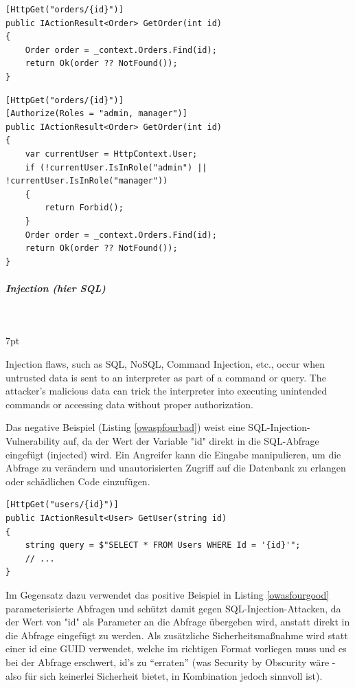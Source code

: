 \documentclass[notitlepage, hidelinks]{article}
\newenvironment{formal}{%
  \def\FrameCommand{%
    \hspace{1pt}%
    {\color{black}\vrule width 2pt}%
    {\color{formalshade}\vrule width 4pt}%
    \colorbox{formalshade}%
  }%
  \MakeFramed{\advance\hsize-\width\FrameRestore}%
  \noindent\hspace{-4.55pt}%
  \begin{adjustwidth}{}{7pt}%
  \vspace{2pt}\vspace{2pt}%
}
{%
  \vspace{2pt}\end{adjustwidth}\endMakeFramed%
}
\begin{document}
\begin{lstlisting}[language={[Sharp]C},frame=single,caption=Negativbeispiel Broken Function Level Authorization,label=owaspthreebad]
[HttpGet("orders/{id}")]
public IActionResult<Order> GetOrder(int id)
{
    Order order = _context.Orders.Find(id);
    return Ok(order ?? NotFound());    
}
\end{lstlisting}


\begin{lstlisting}[language={[Sharp]C},frame=single,caption=Positivbeispiel Broken Function Level Authorization,label=owaspthreegood]
[HttpGet("orders/{id}")]
[Authorize(Roles = "admin, manager")]
public IActionResult<Order> GetOrder(int id)
{
    var currentUser = HttpContext.User;
    if (!currentUser.IsInRole("admin") || !currentUser.IsInRole("manager"))
    {
        return Forbid();
    }
    Order order = _context.Orders.Find(id);
    return Ok(order ?? NotFound());
}
\end{lstlisting}


\subparagraph{Injection (hier SQL)} \mbox{} \\
\begin{formal}
Injection flaws, such as SQL, NoSQL, Command Injection, etc., occur when untrusted data is sent to an interpreter as part of a command or query. The attacker's malicious data can trick the interpreter into executing unintended commands or accessing data without proper authorization.
\end{formal}

Das negative Beispiel (Listing \ref{owaspfourbad}) weist eine SQL-Injection-Vulnerability auf, da der Wert der Variable "id" direkt in die SQL-Abfrage eingefügt (injected) wird. Ein Angreifer kann die Eingabe manipulieren, um die Abfrage zu verändern und unautorisierten Zugriff auf die Datenbank zu erlangen oder schädlichen Code einzufügen.

\begin{lstlisting}[language={[Sharp]C},frame=single,caption=Negativbeispiel Injection,label=owaspfourbad]
[HttpGet("users/{id}")]
public IActionResult<User> GetUser(string id)
{
    string query = $"SELECT * FROM Users WHERE Id = '{id}'";
    // ...
}
\end{lstlisting}

Im Gegensatz dazu verwendet das positive Beispiel in Listing \ref{owasfourgood} parameterisierte Abfragen und schützt damit gegen SQL-Injection-Attacken, da der Wert von "id" als Parameter an die Abfrage übergeben wird, anstatt direkt in die Abfrage eingefügt zu werden. Als zusätzliche Sicherheitsmaßnahme wird statt einer id eine GUID verwendet, welche im richtigen Format vorliegen muss und es bei der Abfrage erschwert, id's zu ``erraten'' (was Security by Obscurity wäre - also für sich keinerlei Sicherheit bietet, in Kombination jedoch sinnvoll ist).
\end{document}
